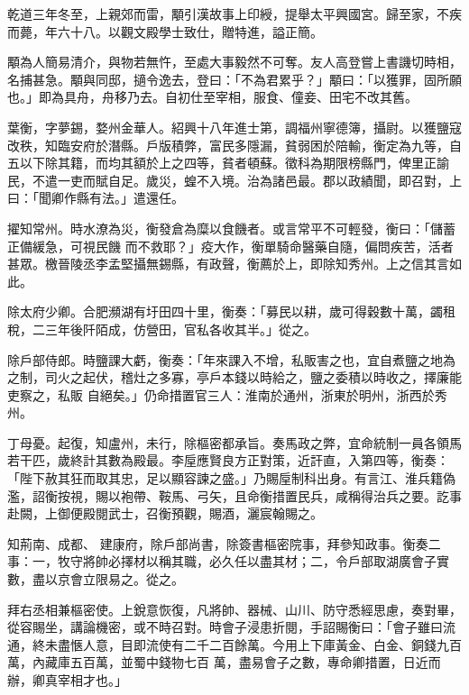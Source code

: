 \begin{pinyinscope}
 乾道三年冬至，上親郊而雷，顒引漢故事上印綬，提舉太平興國宮。歸至家，不疾而薨，年六十八。以觀文殿學士致仕，贈特進，謚正簡。



 顒為人簡易清介，與物若無忤，至處大事毅然不可奪。友人高登嘗上書譏切時相，名捕甚急。顒與同邸，擿令逸去，登曰：「不為君累乎？」顒曰：「以獲罪，固所願也。」即為具舟，舟移乃去。自初仕至宰相，服食、僮妾、田宅不改其舊。



 葉衡，字夢錫，婺州金華人。紹興十八年進士第，調福州寧德簿，攝尉。以獲鹽寇改秩，知臨安府於潛縣。戶版積弊，富民多隱漏，貧弱困於陪輸，衡定為九等，自五以下除其籍，而均其額於上之四等，貧者頓蘇。徵科為期限榜縣門，俾里正諭民，不遣一吏而賦自足。歲災，蝗不入境。治為諸邑最。郡以政績聞，即召對，上曰：「聞卿作縣有法。」遣還任。



 擢知常州。時水潦為災，衡發倉為糜以食饑者。或言常平不可輕發，衡曰：「儲蓄正備緩急，可視民饑
 而不救耶？」疫大作，衡單騎命醫藥自隨，偏問疾苦，活者甚眾。檄晉陵丞李孟堅攝無錫縣，有政聲，衡薦於上，即除知秀州。上之信其言如此。



 除太府少卿。合肥瀕湖有圩田四十里，衡奏：「募民以耕，歲可得穀數十萬，蠲租稅，二三年後阡陌成，仿營田，官私各收其半。」從之。



 除戶部侍郎。時鹽課大虧，衡奏：「年來課入不增，私販害之也，宜自煮鹽之地為之制，司火之起伏，稽灶之多寡，亭戶本錢以時給之，鹽之委積以時收之，擇廉能吏察之，私販
 自絕矣。」仍命措置官三人：淮南於通州，浙東於明州，浙西於秀州。



 丁母憂。起復，知盧州，未行，除樞密都承旨。奏馬政之弊，宜命統制一員各領馬若干匹，歲終計其數為殿最。李垕應賢良方正對策，近訐直，入第四等，衡奏：「陛下赦其狂而取其忠，足以顯容諫之盛。」乃賜垕制科出身。有言江、淮兵籍偽濫，詔衡按視，賜以袍帶、鞍馬、弓矢，且命衡措置民兵，咸稱得治兵之要。訖事赴闕，上御便殿閱武士，召衡預觀，賜酒，灑宸翰賜之。



 知荊南、成都、
 建康府，除戶部尚書，除簽書樞密院事，拜參知政事。衡奏二事：一，牧守將帥必擇材以稱其職，必久任以盡其材；二，令戶部取湖廣會子實數，盡以京會立限易之。從之。



 拜右丞相兼樞密使。上銳意恢復，凡將帥、器械、山川、防守悉經思慮，奏對畢，從容賜坐，講論機密，或不時召對。時會子浸患折閱，手詔賜衡曰：「會子雖曰流通，終未盡愜人意，目即流使有二千二百餘萬。今用上下庫黃金、白金、銅錢九百萬，內藏庫五百萬，並蜀中錢物七百
 萬，盡易會子之數，專命卿措置，日近而辦，卿真宰相才也。」




\end{pinyinscope}
